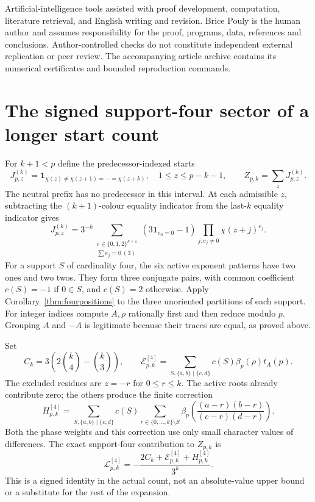 \documentclass[11pt]{article}
\theoremstyle{definition}\newtheorem{definition}[theorem]{Definition}
\newcommand{\ind}{\mathbf1}
\begin{document}
Artificial-intelligence tools assisted with proof development, computation,
literature retrieval, and English writing and revision. Brice Pouly is the
human author and assumes responsibility for the proof, programs, data,
references and conclusions. Author-controlled checks do not constitute
independent external replication or peer review. The accompanying article
archive contains its numerical certificates and bounded reproduction
commands.

\appendix
\section{The signed support-four sector of a longer start count}
For $k+1<p$ define the predecessor-indexed starts
\[
 J_{p,z}^{(k)}=
 \ind_{\chi(z)\ne\chi(z+1)=\cdots=\chi(z+k)},
 \quad 1\le z\le p-k-1,
 \qquad Z_{p,k}=\sum_zJ_{p,z}^{(k)}.
\]
The neutral prefix has no predecessor in this interval.
At each admissible $z$, subtracting the $(k+1)$-colour
equality indicator from the last-$k$ equality indicator gives
\begin{equation}\label{eq:long-expansion}
 J_{p,z}^{(k)}=3^{-k}
 \sum_{\substack{e\in\{0,1,2\}^{k+1}\\\sum e_j=0\ (3)}}
 (3\ind_{e_0=0}-1)
 \prod_{j:e_j\ne0}\chi(z+j)^{e_j}.
\end{equation}
For a support $S$ of cardinality four, the six
active exponent patterns have two ones and two twos.
They form three conjugate pairs, with common coefficient
$c(S)=-1$ if $0\in S$, and $c(S)=2$ otherwise.
Apply Corollary~\ref{thm:fourpositions} to the three
unoriented partitions of each support.
For integer indices compute $A,\rho$ rationally first
and then reduce modulo $p$.
Grouping $A$ and $-A$ is legitimate because their traces
are equal, as proved above.

Set
\[
 C_k=3\left(2\binom{k}{4}-\binom{k}{3}\right),\qquad
 \mathcal E^{[4]}_{p,k}=
 \sum_{S,\{a,b\}\mid\{c,d\}}c(S)\beta_p(\rho)t_A(p).
\]
The excluded residues are $z=-r$ for $0\le r\le k$.
The active roots already contribute zero; the others
produce the finite correction
\[
 H^{[4]}_{p,k}=
 \sum_{S,\{a,b\}\mid\{c,d\}}c(S)
 \sum_{r\in\{0,\ldots,k\}\setminus S}
 \beta_p\left(\frac{(a-r)(b-r)}{(c-r)(d-r)}\right).
\]
Both the phase weights and this correction use
only small character values of differences.
The exact support-four contribution to $Z_{p,k}$ is
\begin{equation}\label{eq:sector}
 \mathcal L^{[4]}_{p,k}=
 -\frac{2C_k+\mathcal E^{[4]}_{p,k}+H^{[4]}_{p,k}}{3^k}.
\end{equation}
This is a signed identity in the actual count,
not an absolute-value upper bound or a substitute
for the rest of the expansion.
\end{document}
